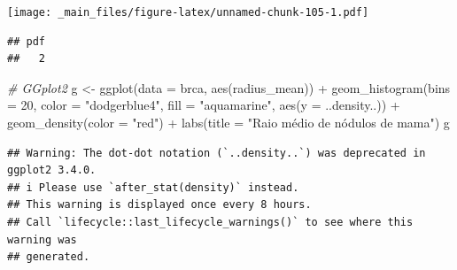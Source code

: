 \documentclass[
]{book}
\newenvironment{Shaded}{\begin{snugshade}}{\end{snugshade}}
\newcommand{\AttributeTok}[1]{\textcolor[rgb]{0.77,0.63,0.00}{#1}}
\newcommand{\CommentTok}[1]{\textcolor[rgb]{0.56,0.35,0.01}{\textit{#1}}}
\newcommand{\DecValTok}[1]{\textcolor[rgb]{0.00,0.00,0.81}{#1}}
\newcommand{\FunctionTok}[1]{\textcolor[rgb]{0.00,0.00,0.00}{#1}}
\newcommand{\NormalTok}[1]{#1}
\newcommand{\OtherTok}[1]{\textcolor[rgb]{0.56,0.35,0.01}{#1}}
\newcommand{\SpecialCharTok}[1]{\textcolor[rgb]{0.00,0.00,0.00}{#1}}
\newcommand{\StringTok}[1]{\textcolor[rgb]{0.31,0.60,0.02}{#1}}
\begin{document}
\texttt{[image: \_main\_files/figure-latex/unnamed-chunk-105-1.pdf]}

\begin{Shaded}
\end{Shaded}

\begin{verbatim}
## pdf 
##   2
\end{verbatim}

\begin{Shaded}
\begin{Highlighting}[]
\CommentTok{\# GGplot2}
\NormalTok{g }\OtherTok{\textless{}{-}} \FunctionTok{ggplot}\NormalTok{(}\AttributeTok{data =}\NormalTok{ brca, }\FunctionTok{aes}\NormalTok{(radius\_mean)) }\SpecialCharTok{+}
  \FunctionTok{geom\_histogram}\NormalTok{(}\AttributeTok{bins =} \DecValTok{20}\NormalTok{, }\AttributeTok{color =} \StringTok{"dodgerblue4"}\NormalTok{, }\AttributeTok{fill =} \StringTok{"aquamarine"}\NormalTok{,}
                 \FunctionTok{aes}\NormalTok{(}\AttributeTok{y =}\NormalTok{ ..density..)) }\SpecialCharTok{+}
  \FunctionTok{geom\_density}\NormalTok{(}\AttributeTok{color =} \StringTok{"red"}\NormalTok{) }\SpecialCharTok{+}
  \FunctionTok{labs}\NormalTok{(}\AttributeTok{title =} \StringTok{"Raio médio de nódulos de mama"}\NormalTok{)}
\NormalTok{g}
\end{Highlighting}
\end{Shaded}

\begin{verbatim}
## Warning: The dot-dot notation (`..density..`) was deprecated in ggplot2 3.4.0.
## i Please use `after_stat(density)` instead.
## This warning is displayed once every 8 hours.
## Call `lifecycle::last_lifecycle_warnings()` to see where this warning was
## generated.
\end{verbatim}
\end{document}
